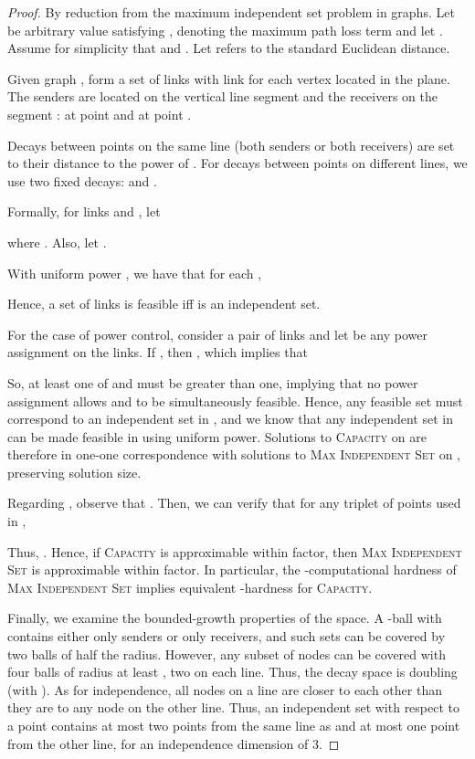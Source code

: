 \documentclass[11pt]{amsart}
\newcommand{\prob}[1]{\textsc{#1}}
\newcommand{\Capacity}{\prob{Capacity}}
\newcommand{\capacity}{\Capacity}
\begin{document}
\begin{proof}
By reduction from the maximum independent set problem in graphs.
Let  be arbitrary value satisfying , 
denoting the maximum path loss term and let .
Assume for simplicity that  and .
Let  refers to the standard Euclidean distance.

Given graph , form a set  of links
with link  for each vertex
 located in the plane.
The senders are located on the vertical line segment 
and the receivers on the segment :
 at point  and  at point .

Decays between points on the same line (both senders or both receivers)
are set to their distance to the power of .
For decays between points on different lines, 
we use two fixed decays:  and .

Formally, for links  and , let
 
where .
Also, let .

With uniform power ,
we have that for each ,

Hence, a set  of links is feasible iff  is an independent set.

For the case of power control, consider a pair of links 
and let  be any power assignment on the links.
If , then 
, which implies that

So, at least one of  and  must be
greater than one, implying that no power assignment allows
 and  to be simultaneously feasible.
Hence, any feasible set  must correspond to an independent set in ,
and we know that any independent set in  can be made feasible in
 using uniform power. Solutions to {\capacity} on  are therefore
in one-one correspondence with solutions to \prob{Max Independent Set}
on , preserving solution size.

Regarding , observe that .
Then, we can verify that for any triplet  of points used in ,

Thus, .
Hence, if \prob{Capacity} is approximable within  factor,
then \prob{Max Independent Set} is approximable within  factor.
In particular, the -computational hardness of \prob{Max Independent
Set} \cite{khot2006better} implies equivalent -hardness for \prob{Capacity}.

Finally, we examine the bounded-growth properties of the space. 
A -ball with  contains either only senders or
only receivers, and such sets can be covered by two balls of half the radius.
However, any subset of nodes can be covered with four balls of radius
at least , two on each line. Thus, the decay
space is doubling (with ).
As for independence, all nodes on a line are closer to each other than
they are to any node on the other line. Thus, an independent set with
respect to a point  contains at most two points from the same line
as  and at most one point from the other line, for an independence
dimension of 3.
\end{proof}
\end{document}
